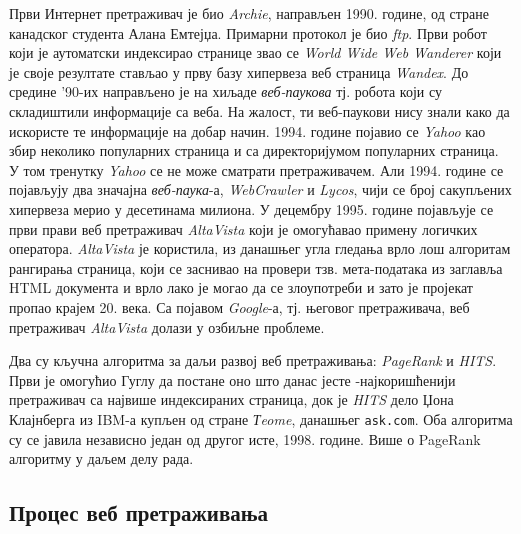 Први Интернет претраживач је био \emph{Archie}, направљен 1990. године, од стране канадског студента Алана Емтејџа. Примарни протокол је био \emph{ftp}. Први робот који је аутоматски индексирао странице звао се \emph{World Wide Web Wanderer} који је своје резултате стављао у прву базу хипервеза веб страница \emph{Wandex}. До средине '90-их направљено је на хиљаде \emph{веб-паукова} тј. робота који су складиштили информације са веба. На жалост, ти веб-паукови нису знали како да искористе те информације на добар начин. 1994. године појавио се \emph{Yahoo} као збир неколико популарних страница и са директоријумом популарних страница. У том тренутку \emph{Yahoo} се не може сматрати претраживачем. Али 1994. године се појављују два значајна \emph{веб-паука}-а, \emph{WebCrawler} и \emph{Lycos}, чији се број сакупљених хипервеза мерио у десетинама милиона. У децембру 1995. године појављује се први прави веб претраживач \emph{AltaVista} који је омогућавао примену логичких оператора. \emph{AltaVista} је користила, из данашњег угла гледања врло лош алгоритам рангирања страница, који се заснивао на провери тзв. мета-података из заглавља HTML документа и врло лако је могао да се злоупотреби и зато је пројекат пропао крајем 20. века. Са појавом \emph{Google}-а, тј. његовог претраживача, веб претраживач \emph{AltaVista} долази у озбиљне проблеме.

Два су кључна алгоритма за даљи развој веб претраживања: \emph{PageRank} и \emph{HITS}. Први је омогућио Гуглу да постане оно што данас јесте -најкоришћенији претраживач са највише индексираних страница, док је \emph{HITS} дело Џона Клајнберга из IBM-а купљен од стране \emph{Тeome}, данашњег \texttt{ask.com}. Оба алгоритма су се јавила независно један од другог исте, 1998. године. Више о PageRank алгоритму у даљем делу рада.

\subsection{Процес веб претраживања}\label{subsec:web}

